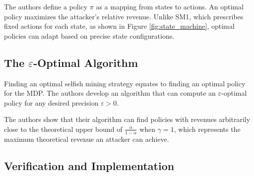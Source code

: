 \documentclass[conference]{IEEEtran}
\begin{document}
The authors define a policy $\pi$ as a mapping from states to actions. An optimal policy maximizes the attacker's relative revenue. Unlike SM1, which prescribes fixed actions for each state, as shown in Figure \ref{fig:state_machine}, optimal policies can adapt based on precise state configurations.

\subsection{The $\varepsilon$-Optimal Algorithm}

Finding an optimal selfish mining strategy equates to finding an optimal policy for the MDP. The authors develop an algorithm that can compute an $\varepsilon$-optimal policy for any desired precision $\varepsilon > 0$. 


    
    
    

The authors show that their algorithm can find policies with revenues arbitrarily close to the theoretical upper bound of $\frac{\alpha}{1-\alpha}$ when $\gamma = 1$, which represents the maximum theoretical revenue an attacker can achieve.

\subsection{Verification and Implementation}
\end{document}
